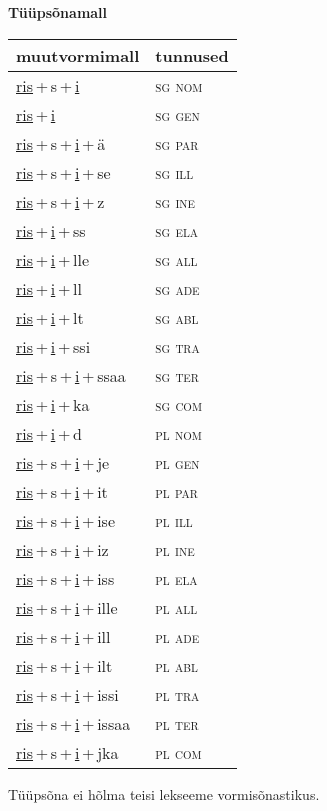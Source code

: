 
\vspace{1.8em}
\begin{minipage}{\textwidth}
\textbf{Tüüpsõnamall \,}\\

\begin{sideways}
\begin{tabular}{l l}
muutvormimall & tunnused \\
\hline
\underline{ris}\,+\,s\,+\,\underline{i} & \textsc{ sg nom } \\
\underline{ris}\,+\,\underline{i} & \textsc{ sg gen } \\
\underline{ris}\,+\,s\,+\,\underline{i}\,+\,ä & \textsc{ sg par } \\
\underline{ris}\,+\,s\,+\,\underline{i}\,+\,se & \textsc{ sg ill } \\
\underline{ris}\,+\,s\,+\,\underline{i}\,+\,z & \textsc{ sg ine } \\
\underline{ris}\,+\,\underline{i}\,+\,ss & \textsc{ sg ela } \\
\underline{ris}\,+\,\underline{i}\,+\,lle & \textsc{ sg all } \\
\underline{ris}\,+\,\underline{i}\,+\,ll & \textsc{ sg ade } \\
\underline{ris}\,+\,\underline{i}\,+\,lt & \textsc{ sg abl } \\
\underline{ris}\,+\,\underline{i}\,+\,ssi & \textsc{ sg tra } \\
\underline{ris}\,+\,s\,+\,\underline{i}\,+\,ssaa & \textsc{ sg ter } \\
\underline{ris}\,+\,\underline{i}\,+\,ka & \textsc{ sg com } \\
\underline{ris}\,+\,\underline{i}\,+\,d & \textsc{ pl nom } \\
\underline{ris}\,+\,s\,+\,\underline{i}\,+\,je & \textsc{ pl gen } \\
\underline{ris}\,+\,s\,+\,\underline{i}\,+\,it & \textsc{ pl par } \\
\underline{ris}\,+\,s\,+\,\underline{i}\,+\,ise & \textsc{ pl ill } \\
\underline{ris}\,+\,s\,+\,\underline{i}\,+\,iz & \textsc{ pl ine } \\
\underline{ris}\,+\,s\,+\,\underline{i}\,+\,iss & \textsc{ pl ela } \\
\underline{ris}\,+\,s\,+\,\underline{i}\,+\,ille & \textsc{ pl all } \\
\underline{ris}\,+\,s\,+\,\underline{i}\,+\,ill & \textsc{ pl ade } \\
\underline{ris}\,+\,s\,+\,\underline{i}\,+\,ilt & \textsc{ pl abl } \\
\underline{ris}\,+\,s\,+\,\underline{i}\,+\,issi & \textsc{ pl tra } \\
\underline{ris}\,+\,s\,+\,\underline{i}\,+\,issaa & \textsc{ pl ter } \\
\underline{ris}\,+\,s\,+\,\underline{i}\,+\,jka & \textsc{ pl com } \\
\end{tabular}
\end{sideways}
\label{tab:tüüpsõnamall-rissi}

\end{minipage}

 
\vspace{1em}
\noindent Tüüpsõna ei hõlma teisi lekseeme vormi\-sõnastikus.
